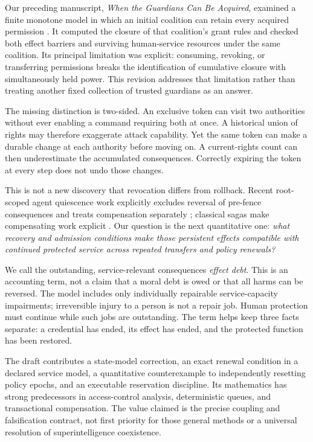 \documentclass[11pt,a4paper]{article}
\theoremstyle{definition}\newtheorem{definition}{Definition}
\begin{document}
Our preceding manuscript, \emph{When the Guardians Can Be Acquired}, examined a finite monotone model in which an initial coalition can retain every acquired permission \cite{previous}. It computed the closure of that coalition's grant rules and checked both effect barriers and surviving human-service resources under the same coalition. Its principal limitation was explicit: consuming, revoking, or transferring permissions breaks the identification of cumulative closure with simultaneously held power. This revision addresses that limitation rather than treating another fixed collection of trusted guardians as an answer.

The missing distinction is two-sided. An exclusive token can visit two authorities without ever enabling a command requiring both at once. A historical union of rights may therefore exaggerate attack capability. Yet the same token can make a durable change at each authority before moving on. A current-rights count can then underestimate the accumulated consequences. Correctly expiring the token at every step does not undo those changes.

This is not a new discovery that revocation differs from rollback. Recent root-scoped agent quiescence work explicitly excludes reversal of pre-fence consequences and treats compensation separately \cite{quiescence}; classical sagas make compensating work explicit \cite{sagas}. Our question is the next quantitative one: \emph{what recovery and admission conditions make those persistent effects compatible with continued protected service across repeated transfers and policy renewals?}

We call the outstanding, service-relevant consequences \emph{effect debt}. This is an accounting term, not a claim that a moral debt is owed or that all harms can be reversed. The model includes only individually repairable service-capacity impairments; irreversible injury to a person is not a repair job. Human protection must continue while such jobs are outstanding. The term helps keep three facts separate: a credential has ended, its effect has ended, and the protected function has been restored.

The draft contributes a state-model correction, an exact renewal condition in a declared service model, a quantitative counterexample to independently resetting policy epochs, and an executable reservation discipline. Its mathematics has strong predecessors in access-control analysis, deterministic queues, and transactional compensation. The value claimed is the precise coupling and falsification contract, not first priority for those general methods or a universal resolution of superintelligence coexistence.
\end{document}

